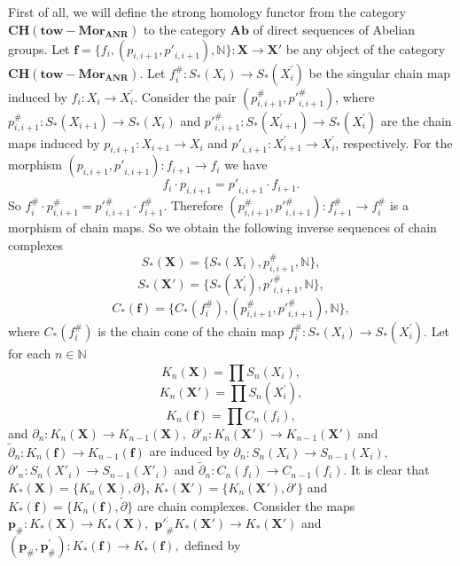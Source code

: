 \documentclass[10pt]{article}
\theoremstyle{definition}
\begin{document}
First of all, we will define the strong homology functor from the category $\mathbf{CH}(\mathbf{tow}-\mathbf{Mo}{{\mathbf{r}}_{\mathbf{ANR}}})$ to the category $\mathbf{Ab}$  of direct sequences of Abelian groups. Let $\mathbf{f}=\{{{f}_{i}},({{p}_{i,i+1}},{p'}_{i,i+1}),\mathbb{N}\}:\mathbf{X \to X'}$ be any object of the category $\mathbf{CH}(\mathbf{tow}-\mathbf{Mo}{{\mathbf{r}}_{\mathbf{ANR}}})$. Let $f_{i}^{\#}:{{S}_{*}}({{X}_{i}})\to {{S}_{*}}(X_{i}^{'})$ be the singular chain map induced by ${{f}_{i}}:{{X}_{i}}\to X_{i}^{'}$. Consider the pair $(p_{i,i+1}^{\#},{p'}_{i,i+1}^{\#})$, where $p_{i,i+1}^{\#}:{{S}_{*}}({{X}_{i+1}})\to {{S}_{*}}({{X}_{i}})$ and ${p'}_{i,i+1}^{\#}:{{S}_{*}}(X_{i+1}^{'})\to {{S}_{*}}(X_{i}^{'})$ are the chain maps induced by ${{p}_{i,i+1}}:{{X}_{i+1}}\to {{X}_{i}}$ and ${p'}_{i,i+1}:X_{i+1}^{'}\to X_{i}^{'}$, respectively. For the morphism  $({{p}_{i,i+1}},{p'}_{i,i+1}):{{f}_{i+1}}\to {{f}_{i}}$ we have
$${{f}_{i}}\cdot {{p}_{i,i+1}}={p'}_{i,i+1}\cdot {{f}_{i+1}}.$$                                        
So $f_{i}^{\#}\cdot p_{i,i+1}^{\#}={p'}_{i,i+1}^{\#}\cdot f_{i+1}^{\#}$. Therefore $(p_{i,i+1}^{\#},{p'}_{i,i+1}^{\#}):f_{i+1}^{\#}\to f_{i}^{\#}$ is a morphism of chain maps. So we obtain the following inverse sequences of chain complexes
$${{S}_{*}}(\mathbf{X})=\{ {{S}_{*}}({{X}_{i}}),p_{i,i+1}^{\#}, \mathbb{N} \} ,$$                                  
 $${{S}_{*}}(\mathbf{{X}'})=\{ {{S}_{*}}(X_{i}^{'}),{p'}_{i,i+1}^{\#}, \mathbb{N} \} ,$$                                
 $${{C}_{*}}(\mathbf{f})=\{ {{C}_{*}}(f_{i}^{\#}),(p_{i,i+1}^{\#},{p'}_{i,i+1}^{\#}), \mathbb{N} \},$$                        
where ${{C}_{*}}(f_{i}^{\#})$ is the chain cone of the chain map $f_{i}^{\#}:{{S}_{*}}({{X}_{i}})\to {{S}_{*}}(X_{i}^{'})$.  Let for each $n\in \mathbb{N}$
$${{K}_{n}}(\mathbf{X})=\mathop{\prod }^{}{{S}_{n}}({{X}_{i}}),$$                                         
$${{K}_{n}}(\mathbf{{X}'})=\mathop{\prod }^{}{{S}_{n}}(X_{i}^{'}),$$                                          
$${{K}_{n}}(\mathbf{f})=\mathop{\prod }^{}{{C}_{n}}({{f}_{i}}),$$                                           
and ${{\partial }_{n}}:{{K}_{n}}(\mathbf{X})\to {{K}_{n-1}}(\mathbf{X}),$ ${{\partial' }_{n}}:{{K}_{n}}(\mathbf{{X}'})\to {{K}_{n-1}}(\mathbf{{X}'})$  and  ${\tilde {{\partial }}_{n}}:{{K}_{n}}(\mathbf{f})\to {{K}_{n-1}}(\mathbf{f})$  are induced by ${{\partial }_{n}}:{S_{n}}(X_i)\to {S_{n-1}}(X_i),$ ${{\partial' }_{n}}:{S_{n}}(X'_i)\to {S_{n-1}}(X'_i)$  and  ${\tilde{{\partial }}_{n}}:{C_{n}}(f_i)\to {C_{n-1}}(f_i)$. It is clear that ${{K}_{*}}( \mathbf{X} )=\{{{K}_{n}}( \mathbf{X} ),\partial  \}$,  ${{K}_{*}}( {\mathbf{{X}'}} )=\{{{K}_{n}}( {\mathbf{{X}'}} ),\partial'  \}$ and ${{K}_{*}}( \mathbf{f} )=\{{{K}_{n}}( \mathbf{f} ),\tilde{\partial } \}$ are chain complexes.  Consider the maps ${{\mathbf{p}}_{\#}}:{{K}_{*}}( \mathbf{X} )\to {{K}_{*}}( \mathbf{X} ),$  $\mathbf{p'}_{\#}^:{{K}_{*}}( {\mathbf{{X}'}} )\to {{K}_{*}}( {\mathbf{{X}'}} )$  and $( {{\mathbf{p}}_{\#}},\mathbf{p}_{\#}^{'} ):{{K}_{*}}( \mathbf{f} )\to {{K}_{*}}( \mathbf{f} ),$  defined by
\end{document}
